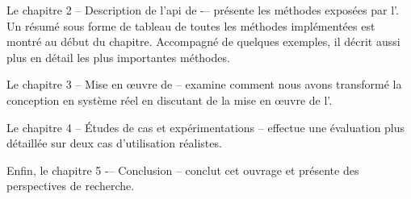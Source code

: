 \begin{introduction}
Le chapitre 2 -- Description de l'api de  -– pr\'esente les m\'ethodes expos\'ees par l'. Un r\'esum\'e sous forme de tableau de toutes les m\'ethodes implément\'ees est montr\'e au d\'ebut du chapitre. Accompagn\'e de quelques exemples, il d\'ecrit aussi plus en d\'etail les plus importantes m\'ethodes.

Le chapitre 3 -- Mise en œuvre de  -- examine comment nous avons transform\'e la conception en syst\`eme r\'eel en discutant de la mise en œuvre de l'.

Le chapitre 4 -- \'Etudes de cas et exp\'erimentations -- effectue une \'evaluation plus d\'etaill\'ee sur deux cas d'utilisation r\'ealistes. 

Enfin, le chapitre 5 -– Conclusion -- conclut cet ouvrage et pr\'esente des perspectives de recherche.



\end{introduction}

